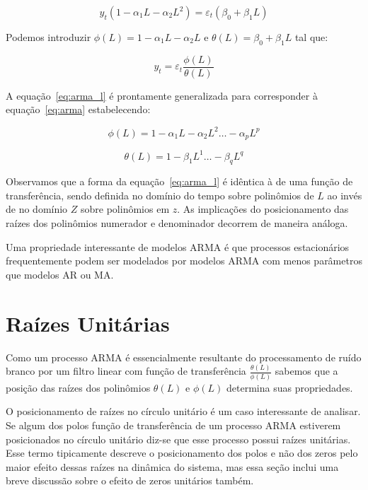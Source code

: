 $$ y_t (1 - \alpha_1 L - \alpha_2 L^2) = \varepsilon_{t} (\beta_0 + \beta_1 L) $$

Podemos introduzir $\phi(L) = 1 - \alpha_1 L - \alpha_2 L$ e $\theta(L) =
\beta_0 + \beta_1 L$ tal que:

\begin{equation}\label{eq:arma_l}
    y_t = \varepsilon_t \frac{\phi(L)}{\theta(L)}
\end{equation}

A equação~\ref{eq:arma_l} é prontamente generalizada para corresponder à
equação~\ref{eq:arma} estabelecendo:

$$\phi(L) = 1 - \alpha_1 L - \alpha_2 L^2 \hdots - \alpha_p L^p$$

$$\theta(L) = 1 - \beta_1 L^1 \hdots - \beta_q L^q$$


Observamos que a forma da equação~\ref{eq:arma_l} é idêntica à de uma função de
transferência, sendo definida no domínio do tempo sobre polinômios de $L$ ao
invés de no domínio $Z$ sobre polinômios em $z$. As implicações do
posicionamento das raízes dos polinômios numerador e denominador decorrem de
maneira análoga.

Uma propriedade interessante de modelos ARMA é que processos estacionários
frequentemente podem ser modelados por modelos ARMA com menos parâmetros que
modelos AR ou MA.



\section{Raízes Unitárias}
\label{sec:unit_roots}

Como um processo ARMA é essencialmente resultante do processamento de ruído
branco por um filtro linear com função de transferência
$\frac{\theta(L)}{\phi(L)}$ sabemos que a posição das raízes dos polinômios
$\theta(L)$ e $\phi(L)$ determina suas propriedades.

O posicionamento de raízes no círculo unitário é um caso interessante de
analisar. Se algum dos polos função de transferência de um processo ARMA
estiverem posicionados no círculo unitário diz-se que esse processo possui
raízes unitárias. Esse termo tipicamente descreve o posicionamento dos polos e
não dos zeros pelo maior efeito dessas raízes na dinâmica do sistema, mas essa
seção inclui uma breve discussão sobre o efeito de zeros unitários também.

